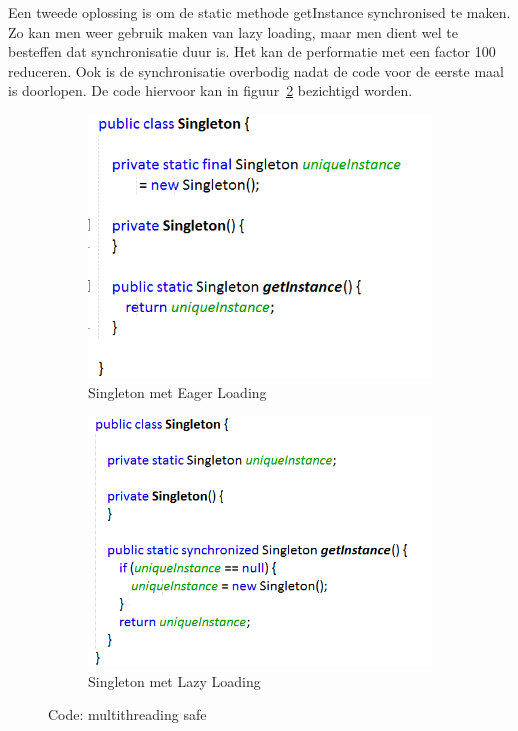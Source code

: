 \documentclass[a4paper,12pt]{article}
\begin{document}
Een tweede oplossing is om de static methode getInstance synchronised te maken. Zo kan men weer gebruik maken van lazy loading, maar men dient wel te besteffen dat synchronisatie duur is. Het kan de performatie met een factor 100 reduceren. Ook is de synchronisatie overbodig nadat de code voor de eerste maal is doorlopen. De code hiervoor kan in figuur~\ref{fig:SingletonLazyLoading} bezichtigd worden.

\begin{figure}[H]
\centering
\begin{subfigure}{.49\textwidth}
  \centering
  \includegraphics[width=.9\linewidth]{img/Singleton/SingletonZonderLazyLoading.png}
  \caption{Singleton met Eager Loading}
  \label{fig:SingletonEagerLoading}
\end{subfigure}
\begin{subfigure}{.49\textwidth}
  \centering
  \includegraphics[width=.9\linewidth]{img/Singleton/SingletonMetLazyLoading.png}
  \caption{Singleton met Lazy Loading}
  \label{fig:SingletonLazyLoading}
  \end{subfigure}
\caption{Code: multithreading safe}
\label{fig:SingletonMultithreadSafe}
\end{figure}
\end{document}
